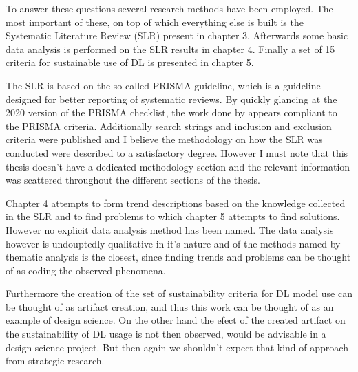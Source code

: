 \documentclass{article}
\begin{document}
	\par To answer these questions several research methods have been 
employed. The most important of these, on top of which everything else is built 
is the Systematic Literature Review (SLR) present in chapter 3. Afterwards some 
basic data analysis is performed on the SLR results in chapter 4. Finally a set 
of 15 criteria for sustainable use of DL is presented in chapter 5.
	\par The SLR is based on the so-called PRISMA guideline,\parencite{E1} 
which is a guideline designed for better reporting of systematic reviews. By 
quickly glancing at the 2020 version of the PRISMA checklist, the work done by 
\textcite{T1} appears compliant to the PRISMA criteria. Additionally search 
strings and inclusion and exclusion criteria were published and I believe the 
methodology on how the SLR was conducted were described to a satisfactory 
degree. However I must note that this thesis doesn't have a dedicated 
methodology section and the relevant information was scattered throughout the 
different sections of the thesis.
	\par Chapter 4 attempts to form trend descriptions based on the 
knowledge collected in the SLR and to find problems to which chapter 5 attempts 
to find solutions. However no explicit data analysis method has been named. The 
data analysis however is undouptedly qualitative in it's nature and of the 
methods named by \textcite{P1} thematic analysis is the closest, since finding 
trends and problems can be thought of as coding the observed phenomena.
	\par Furthermore the creation of the set of sustainability criteria for 
DL model use can be thought of as artifact creation, and thus this work can be 
thought of as an example of design science.\parencite{P1} On the other hand 
the efect of the created artifact on the sustainability of DL usage is not 
then observed, would be advisable in a design science project.\parencite{V5} 
But then again we shouldn't expect that kind of approach from strategic 
research.\parencite{V2}

\end{document}
